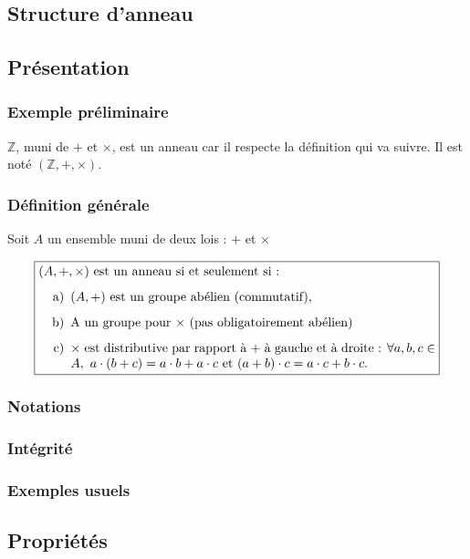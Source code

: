 \documentclass[12pt,a4paper,french]{book}
\begin{document}
\begin{spacing}{1.0}
	\section{Structure d'anneau}
		\subsection{Présentation}

			\subsubsection{Exemple préliminaire}
			\(\mathbb{Z}\), muni de \(+\) et \(\times\), est un anneau car il respecte la définition qui va suivre.  
			Il est noté \((\mathbb{Z}, +, \times)\).

			\subsubsection{Définition générale}
			Soit \(A\) un ensemble muni de deux lois : \(+\) et \(\times\)

			\[
			\boxed{
				\begin{minipage}{0.9\textwidth}
					\((A, +, \times)\) est un anneau si et seulement si :  
					\begin{itemize}
						\item[a)] \((A, +)\) est un groupe abélien 	(commutatif),
						\item[b)] A un groupe pour $\times$ (pas obligatoirement abélien)
						\item[c)] \(\times\) est distributive par rapport à 	\(+\) à gauche et à droite :  
						\(\forall a, b, c \in A,\ a \cdot (b + c) = a \cdot b + a \cdot c\) et  
						\((a + b) \cdot c = a \cdot c + b \cdot c\).
					\end{itemize}
				\end{minipage}
			}
			\]
			\subsubsection{Notations}
			\subsubsection{Intégrité}
			\subsubsection{Exemples usuels}
		\subsection{Propriétés}

\end{spacing}
\end{document}

